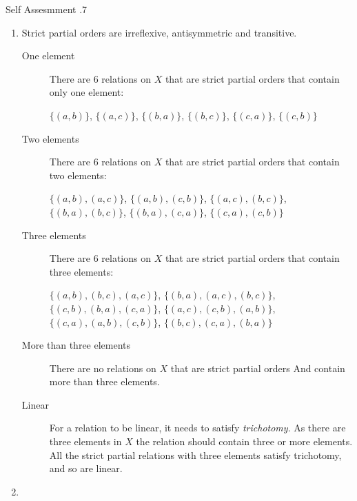 \documentclass[../notes.tex]{subfiles}
\begin{document}
				\begin{exercise}{Self Assesmment \thechapter.7}
					\begin{enumerate}
						\item {}
							Strict partial orders are irreflexive, antisymmetric and transitive.
							\begin{description}
								\item[One element] There are $6$ relations on $X$ that are strict partial orders that contain only one element:
									\begin{center}
										$ \bigl\{(a, b)\bigr\}$, $\bigl\{(a, c)\bigr\}$, $\bigl\{(b, a)\bigr\}$, $\bigl\{(b, c)\bigr\}$, $\bigl\{(c, a)\bigr\}$, $\bigl\{(c, b)\bigr\}$
									\end{center}
								\item[Two elements] There are $6$ relations on $X$ that are strict partial orders that contain two elements:
									\begin{center}
										$ \bigl\{(a, b), (a, c)\bigr\}$, $ \bigl\{(a, b), (c, b)\bigr\}$, $ \bigl\{(a, c), (b, c)\bigr\}$, $ \bigl\{(b, a), (b, c)\bigr\}$, $ \bigl\{(b, a), (c, a)\bigr\}$, $\bigl\{(c, a), (c, b)\bigr\}$
									\end{center}
								\tcbbreak
								\item[Three elements] There are $6$ relations on $X$ that are strict partial orders that contain three elements:
									\begin{center}
										$\bigl\{(a, b), (b, c), (a, c)\bigr\}$, $\bigl\{(b, a), (a, c), (b, c)\bigr\}$, $\bigl\{(c, b), (b, a), (c, a)\bigr\}$, $\bigl\{(a, c), (c, b), (a, b)\bigr\}$, $\bigl\{(c, a), (a, b), (c, b)\bigr\}$, $\bigl\{(b, c), (c, a), (b, a)\bigr\}$
									\end{center}
								\item[More than three elements] There are no relations on $X$ that are strict partial orders And contain more than three elements.
								\item[Linear] For a relation to be linear, it needs to satisfy \emph{trichotomy}. As there are three elements in $X$ the relation should contain three or more elements.\\
									All the strict partial relations with three elements satisfy trichotomy, and so are linear. 
							\end{description}
						\item {}

\end{enumerate}
\end{exercise}
\end{document}
